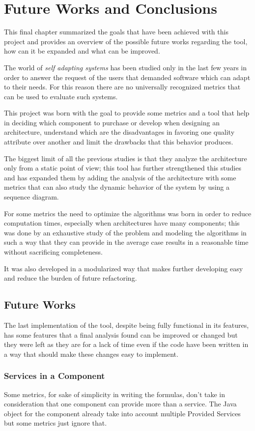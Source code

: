 \chapter{Future Works and Conclusions}
\label{cap:discussion}
This final chapter summarized the goals that have been achieved with this project and provides an overview of the possible future works regarding the tool, how can it be expanded and what can be improved.

The world of \emph{self adapting systems} has been studied only in the last few years in order to answer the request of the users that demanded software which can adapt to their needs. For this reason there are no universally recognized metrics that can be used to evaluate such systems.

This project was born with the goal to provide some metrics and a tool that help in deciding which component to purchase or develop when designing an architecture, understand which are the disadvantages in favoring one quality attribute over another and limit the drawbacks that this behavior produces.

The biggest limit of all the previous studies is that they analyze the architecture only from a static point of view; this tool has further strengthened this studies and has expanded them by adding the analysis of the architecture with some metrics that can also study the dynamic behavior of the system by using a sequence diagram. 

For some metrics the need to optimize the algorithms was born in order to reduce computation times, especially when architectures have many components; this was done by an exhaustive study of the problem and modeling  the algorithms in such a way that they can provide in the average case results in a reasonable time without sacrificing completeness.

It was also developed in a modularized way that makes further developing easy and reduce the burden of future refactoring.

\section{Future Works}
The last implementation of the tool, despite being fully functional in its features, has some features that a final analysis found can be improved or changed but they were left as they are for a lack of time even if the code have been written in a way that should make these changes easy to implement.

\subsection{Services in a Component}
Some metrics, for sake of simplicity in writing the formulas, don't take in consideration that one component can provide more than a service. The Java object for the component already take into account multiple Provided Services but some metrics just ignore that.

